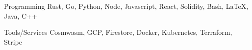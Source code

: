 



\begin{cvskills}

  \cvskill
    {Programming} %
    {Rust, Go, Python, Node, Javascript, React, Solidity, Bash, \LaTeX, Java, C++} %

  \cvskill
    {Tools/Services} %
    {Cosmwasm, GCP, Firestore, Docker, Kubernetes, Terraform, Stripe} %

\end{cvskills}


% 
% 
% 
% 
% 
% 
